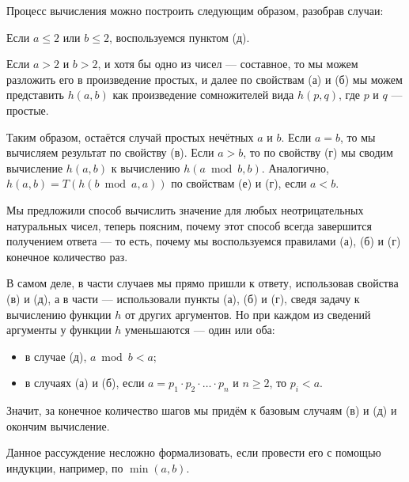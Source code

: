 \begin{enumerate}
Процесс вычисления можно построить следующим образом, разобрав случаи: 

Если $a \le 2$ или $b \le 2$, воспользуемся пунктом (д).

Если $a > 2$ и $b > 2$, и хотя бы одно из чисел --- составное, то мы можем разложить
его в произведение простых, и далее по свойствам (а) и (б) 
мы можем представить $h(a,b)$ как произведение сомножителей вида $h(p,q)$, 
где $p$ и $q$ --- простые.

Таким образом, остаётся случай простых нечётных $a$ и $b$. Если
$a = b$, то мы вычисляем результат по свойству (в). Если $a > b$, то
по свойству (г) мы сводим вычисление $h(a,b)$ к вычислению $h(a \bmod b,b)$. 
Аналогично, $h(a,b) = T(h(b \bmod a,a))$ по свойствам (е) и (г), если $a < b$.

Мы предложили способ вычислить значение для любых неотрицательных натуральных
чисел, теперь поясним, почему этот способ всегда завершится получением
ответа --- то есть, почему мы воспользуемся правилами (а), (б) и (г) конечное количество раз.

В самом деле, в части случаев мы прямо пришли к ответу, использовав свойства (в) и (д), а в части ---
использовали пункты (а), (б) и (г), сведя задачу к вычислению функции $h$
от других аргументов. Но при каждом из сведений аргументы у функции $h$ уменьшаются ---
один или оба: \begin{itemize}
\item в случае (д), $a \bmod b < a$;
\item в случаях (а) и (б), если $a = p_1 \cdot p_2 \cdot \ldots \cdot p_n$ и $n \ge 2$, то $p_i < a$.
\end{itemize}

Значит, за конечное количество шагов мы придём к базовым случаям (в) и (д) и окончим вычисление.

Данное рассуждение несложно формализовать, если провести его с помощью индукции, например, 
по $\min(a,b)$.
\end{enumerate}
